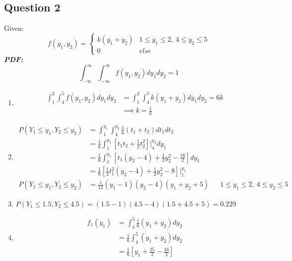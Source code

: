 \documentclass[13pt]{article}
\begin{document}
\subsection*{Question 2}
Given:
\[f(y_1, y_2) =
  \begin{cases}
    k(y_1 + y_2) & 1 \leq y_1 \leq 2, \ 4 \leq y_2 \leq 5 \\
    0 & \textit{else}
  \end{cases}
\]
\textit{\textbf{PDF:}}
\[\int_{- \infty}^{\infty} \int_{- \infty}^{\infty} f(y_1, y_2) dy_1 dy_2 = 1\]
\begin{enumerate}[label=(\alph*)]
\item
  \begin{align*}
    \int_{1}^{2} \int_{4}^{5} f(y_1, y_2) dy_1 dy_2 &= \int_{1}^{2} \int_{4}^{5} k(y_1 + y_2) dy_1 dy_2 = 6k\\
                                                    &\implies k = \frac{1}{6}
  \end{align*}
\item
  \begin{align*}
    P(Y_1 \leq y_1, Y_2 \leq y_2) &= \int_{1}^{y_1} \int_{4}^{y_2} \frac{1}{6}(t_1 + t_2) dt_1 dt_2 \\
                                  &= \frac{1}{6} \int_{1}^{y_1} \left[ t_1t_2
                                    + \frac{1}{2}t_2^2 \right] \bigg|_{4}^{y_2} dy_1 \\
                                  &= \frac{1}{6} \int_{1}^{y_1} \left[ t_1(y_2 - 4)
                                    + \frac{1}{2}y_2^2 - \frac{16}{2} \right] dy_1 \\
                                  &= \frac{1}{6} \left[ \frac{1}{2}t_1^2 (y_2 - 4)
                                    + \frac{1}{2}y_2^2 - 8 \right] \bigg|_{1}^{y_1} \\
    P(Y_1 \leq y_1, Y_2 \leq y_2) &= \frac{1}{12}(y_1 - 1)(y_2 - 4)(y_1 + y_2 + 5)
                                  && 1 \leq y_1 \leq 2, \ 4 \leq y_2 \leq 5
  \end{align*}
\item $P(Y_1 \leq 1.5, Y_2 \leq 4.5) = (1.5 - 1)(4.5 - 4)(1.5 + 4.5 + 5) = 0.229$
\item
  \begin{align*}
    f_1(y_1) &= \int_{4}^{5} \frac{1}{6}(y_1 + y_2)dy_2 \\
             &= \frac{1}{6} \int_{4}^{5} (y_1 + y_2)dy_2 \\
             &= \frac{1}{6} \left[ y_1 + \frac{25}{2} - \frac{16}{2} \right] \\

\end{align*}
\end{enumerate}
\end{document}
